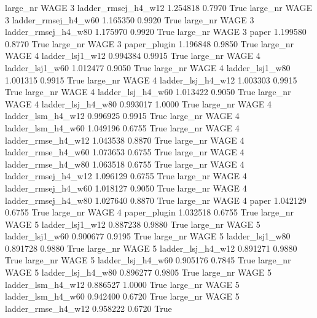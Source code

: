   large_nr     WAGE                 3 ladder_rmsej_h4_w12   1.254818      0.7970    True
  large_nr     WAGE                 3 ladder_rmsej_h4_w60   1.165350      0.9920    True
  large_nr     WAGE                 3 ladder_rmsej_h4_w80   1.175970      0.9920    True
  large_nr     WAGE                 3               paper   1.199580      0.8770    True
  large_nr     WAGE                 3        paper_plugin   1.196848      0.9850    True
  large_nr     WAGE                 4     ladder_lsj1_w12   0.994384      0.9915    True
  large_nr     WAGE                 4     ladder_lsj1_w60   1.012477      0.9050    True
  large_nr     WAGE                 4     ladder_lsj1_w80   1.001315      0.9915    True
  large_nr     WAGE                 4   ladder_lsj_h4_w12   1.003303      0.9915    True
  large_nr     WAGE                 4   ladder_lsj_h4_w60   1.013422      0.9050    True
  large_nr     WAGE                 4   ladder_lsj_h4_w80   0.993017      1.0000    True
  large_nr     WAGE                 4   ladder_lsm_h4_w12   0.996925      0.9915    True
  large_nr     WAGE                 4   ladder_lsm_h4_w60   1.049196      0.6755    True
  large_nr     WAGE                 4  ladder_rmse_h4_w12   1.043538      0.8870    True
  large_nr     WAGE                 4  ladder_rmse_h4_w60   1.073653      0.6755    True
  large_nr     WAGE                 4  ladder_rmse_h4_w80   1.063518      0.6755    True
  large_nr     WAGE                 4 ladder_rmsej_h4_w12   1.096129      0.6755    True
  large_nr     WAGE                 4 ladder_rmsej_h4_w60   1.018127      0.9050    True
  large_nr     WAGE                 4 ladder_rmsej_h4_w80   1.027640      0.8870    True
  large_nr     WAGE                 4               paper   1.042129      0.6755    True
  large_nr     WAGE                 4        paper_plugin   1.032518      0.6755    True
  large_nr     WAGE                 5     ladder_lsj1_w12   0.887238      0.9880    True
  large_nr     WAGE                 5     ladder_lsj1_w60   0.900677      0.9195    True
  large_nr     WAGE                 5     ladder_lsj1_w80   0.891728      0.9880    True
  large_nr     WAGE                 5   ladder_lsj_h4_w12   0.891271      0.9880    True
  large_nr     WAGE                 5   ladder_lsj_h4_w60   0.905176      0.7845    True
  large_nr     WAGE                 5   ladder_lsj_h4_w80   0.896277      0.9805    True
  large_nr     WAGE                 5   ladder_lsm_h4_w12   0.886527      1.0000    True
  large_nr     WAGE                 5   ladder_lsm_h4_w60   0.942400      0.6720    True
  large_nr     WAGE                 5  ladder_rmse_h4_w12   0.958222      0.6720    True
